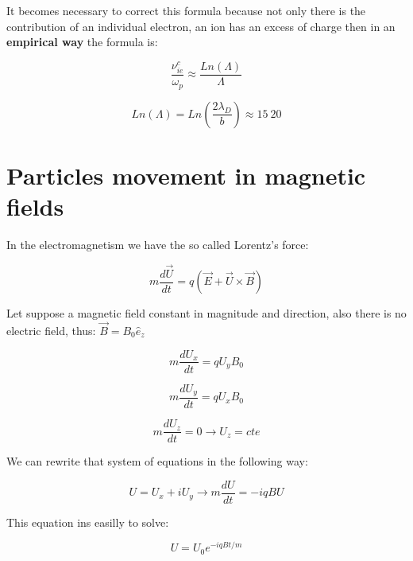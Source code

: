 \documentclass[spanish,notitlepage,letterpaper,11pt]{article} %
\numberwithin{equation}{subsection}
\begin{document}
        It becomes necessary to correct this formula because not only there is the contribution of an individual electron, an ion has an excess of charge then in an \textbf{empirical way} the formula is: 

        \begin{equation}\label{eq:}
            \frac{\nu^c_{ie}}{\omega_p} \approx \frac{Ln(\Lambda)}{\Lambda}
        \end{equation}

        \begin{equation*}
            Ln(\Lambda) = Ln(\frac{2\lambda_D}{b}) \approx 15 ~ 20
        \end{equation*}


    \section{Particles movement in magnetic fields}

        In the electromagnetism we have the so called Lorentz's force:

        \begin{equation}
            m\frac{d\Vec{U}}{dt} = q(\Vec{E} + \Vec{U}\times \Vec{B})
        \end{equation}

        Let suppose a magnetic field constant in magnitude and direction, also there is no electric field, thus: $\Vec{B} = B_0\hat{e}_z$

        \begin{equation*}
            m\frac{dU_x}{dt}=qU_yB_0
        \end{equation*}

        \begin{equation*}
            m\frac{dU_y}{dt}=qU_xB_0
        \end{equation*}

        \begin{equation*}
            m\frac{dU_z}{dt} = 0 \rightarrow U_z = cte
        \end{equation*}

        We  can rewrite that system of equations in the following way:

        \begin{equation*}
            U = U_x + iU_y \rightarrow m\frac{dU}{dt} = -iqBU
        \end{equation*}

        This equation ins easilly to solve:

        \begin{equation}
            U = U_0e^{-iqBt/m}
        \end{equation}
\end{document}
